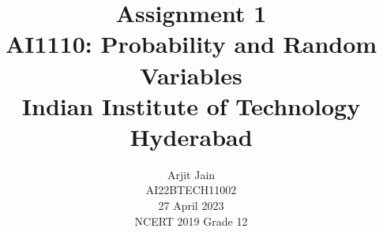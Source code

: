 \documentclass[journal,12pt,twocolumn]{IEEEtran}
\title{Assignment 1 \\ \Large AI1110: Probability and Random Variables \\ \large Indian Institute of Technology Hyderabad}
\author{Arjit Jain \\ \normalsize AI22BTECH11002 \\ \vspace*{20pt} \normalsize  27 April 2023 \\ \vspace*{20pt} \Large NCERT 2019 Grade 12}
\DeclareMathOperator*{\Res}{Res}
\begin{document}
\newtheorem{theorem}{Theorem}[section]
\newtheorem{problem}{Problem}
\newtheorem{proposition}{Proposition}[section]
\newtheorem{lemma}{Lemma}[section]
\newtheorem{corollary}[theorem]{Corollary}
\newtheorem{example}{Example}[section]
\newtheorem{definition}[problem]{Definition}

\newcommand{\BEQA}{\begin{eqnarray}}
\newcommand{\EEQA}{\end{eqnarray}}
\newcommand{\define}{\stackrel{\triangle}{=}}




\providecommand{\mbf}{\mathbf}
\providecommand{\pr}[1]{\ensuremath{\Pr\left(#1\right)}}
\providecommand{\qfunc}[1]{\ensuremath{Q\left(#1\right)}}
\providecommand{\sbrak}[1]{\ensuremath{{}\left[#1\right]}}
\providecommand{\lsbrak}[1]{\ensuremath{{}\left[#1\right.}}
\providecommand{\rsbrak}[1]{\ensuremath{{}\left.#1\right]}}
\providecommand{\brak}[1]{\ensuremath{\left(#1\right)}}
\providecommand{\lbrak}[1]{\ensuremath{\left(#1\right.}}
\providecommand{\rbrak}[1]{\ensuremath{\left.#1\right)}}
\providecommand{\cbrak}[1]{\ensuremath{\left\{#1\right\}}}
\providecommand{\lcbrak}[1]{\ensuremath{\left\{#1\right.}}
\providecommand{\rcbrak}[1]{\ensuremath{\left.#1\right\}}}
\theoremstyle{remark}
\newtheorem{rem}{Remark}
\newcommand{\sgn}{\mathop{\mathrm{sgn}}}
\providecommand{\abs}[1]{$\left\vert#1\right\vert$}
\providecommand{\res}[1]{\Res\displaylimits_{#1}} 
\providecommand{\norm}[1]{$\left\lVert#1\right\rVert$}
\providecommand{\mtx}[1]{\mathbf{#1}}
\providecommand{\mean}[1]{E$\left[ #1 \right]$}
\providecommand{\fourier}{\overset{\mathcal{F}}{ \rightleftharpoons}}
\providecommand{\system}{\overset{\mathcal{H}}{ \longleftrightarrow}}
\newcommand{\solution}{\noindent \textbf{Solution: }}
\newcommand{\cosec}{\,\text{cosec}\,}
\providecommand{\dec}[2]{\ensuremath{\overset{#1}{\underset{#2}{\gtrless}}}}
\newcommand{\myvec}[1]{\ensuremath{\begin{pmatrix}#1\end{pmatrix}}}
\newcommand{\mydet}[1]{\ensuremath{\begin{vmatrix}#1\end{vmatrix}}}

\let\vec\mathbf


  \maketitle
\newpage

\large
\end{document}
